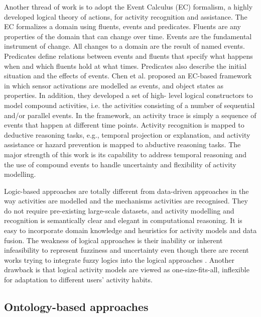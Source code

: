Another thread of work is to adopt the Event Calculus (EC) \cite{Shanahan1997} formalism, a highly developed logical theory of actions, for activity recognition and assistance. The EC formalizes a domain using fluents, events and predicates. Fluents are any properties of the domain that can change over time. Events are the fundamental instrument of change. All changes to a domain are the result of named events. Predicates define relations between events and fluents that specify what happens when and which fluents hold at what times. Predicates also describe the initial situation and the effects of events. Chen et al. \cite{Chen2008} proposed an EC-based framework in which sensor activations are modelled as events, and object states as properties. In addition, they developed a set of high- level logical constructors to model compound activities, i.e. the activities consisting of a number of sequential and/or parallel events. In the framework, an activity trace is simply a sequence of events that happen at different time points. Activity recognition is mapped to deductive reasoning tasks, e.g., temporal projection or explanation, and activity assistance or hazard prevention is mapped to abductive reasoning tasks. The major strength of this work is its capability to address temporal reasoning and the use of compound events to handle uncertainty and flexibility of activity modelling. 

Logic-based approaches are totally different from data-driven approaches in the way activities are modelled and the mechanisms activities are recognised. They do not require pre-existing large-scale datasets, and activity modelling and recognition is semantically clear and elegant in computational reasoning. It is easy to incorporate domain knowledge and heuristics for activity models and data fusion. The weakness of logical approaches is their inability or inherent infeasibility to represent fuzziness and uncertainty even though there are recent works trying to integrate fuzzy logics into the logical approaches \cite{Almeida2012}. Another drawback is that logical activity models are viewed as one-size-fits-all, inflexible for adaptation to different users’ activity habits.

\subsection{Ontology-based approaches}
\label{subsec:soa:ontology}

